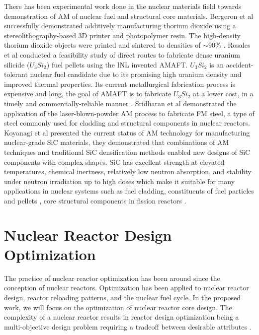 There has been experimental work done in the nuclear materials field towards 
demonstration of \gls{AM} of nuclear fuel and structural core materials. 
Bergeron et al \cite{bergeron_early_2018} successfully demonstrated additively 
manufacturing thorium dioxide using a stereolithography-based 3D printer 
and photopolymer resin. 
The high-density thorium dioxide objects were printed and sintered to densities 
of $\sim90\%$ \cite{bergeron_early_2018}. 
Rosales et al \cite{rosales_characterizing_2019} conducted a feasibility study 
of direct routes to fabricate dense uranium silicide ($U_3Si_2$) fuel pellets 
using the \gls{INL} invented \gls{AMAFT}. 
$U_3Si_2$ is an accident-tolerant nuclear fuel candidate due to its promising 
high uranium density and improved thermal properties. 
Its current metallurgical fabrication process is expensive and long, the goal of
\gls{AMAFT} is to fabricate $U_3Si_2$ at a lower cost, in a timely and
commercially-reliable manner \cite{rosales_characterizing_2019}.  
Sridharan et al \cite{sridharan_performance_2019} demonstrated the application of
the laser-blown-powder \gls{AM} process to fabricate \gls{FM} steel, a type of 
steel commonly used for cladding and structural components in nuclear reactors. 
Koyanagi et al \cite{koyanagi_additive_2020} presented the current status of 
\gls{AM} technology for manufacturing nuclear-grade \gls{SiC} materials, they 
demonstrated that combinations of \gls{AM} techniques and traditional \gls{SiC} 
densification methods enabled new designs of \gls{SiC} components with complex shapes. 
\gls{SiC} has excellent strength at elevated temperatures, chemical inertness, 
relatively low neutron absorption, and stability under neutron irradiation up 
to high doses \cite{sauder_ceramic_2014, snead_handbook_2007,koyanagi_additive_2020} 
which make it suitable for many applications in nuclear systems such as fuel cladding, 
constituents of fuel particles \cite{snead_handbook_2007} and pellets
\cite{terrani_progress_2015}, core structural components in fission reactors 
\cite{sauder_ceramic_2014}. 

\section{Nuclear Reactor Design Optimization}
The practice of nuclear reactor optimization has been around since the conception of 
nuclear reactors. 
Optimization has been applied to nuclear reactor design, reactor reloading 
patterns, and the nuclear fuel cycle.  
In the proposed work, we will focus on the optimization of nuclear reactor 
core design. 
The complexity of a nuclear reactor results in reactor design optimization 
being a multi-objective design problem requiring a tradeoff between desirable 
attributes \cite{byrne_evolving_2014,simon_sciences_2019}. 


